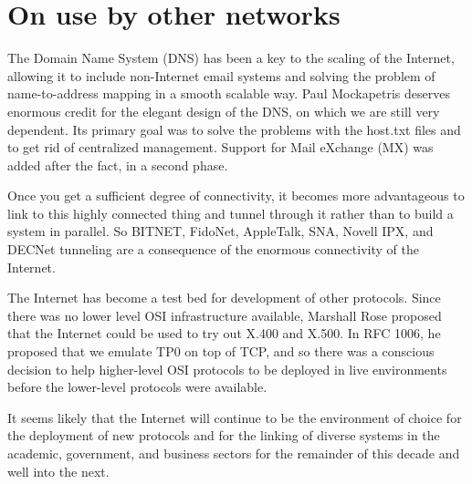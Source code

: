 \documentclass[10pt,a4paper]{scrartcl}
\begin{document}
{\section {On use by other networks}}

The Domain Name System (DNS) has been a key to the scaling of the Internet, allowing it to include non-Internet email systems and solving the problem of name-to-address mapping in a smooth scalable way. Paul Mockapetris deserves enormous credit for the elegant design of the DNS, on which we are still very dependent. Its primary goal was to solve the problems with the host.txt files and to get rid of centralized management. Support for Mail eXchange (MX) was added after the fact, in a second phase.

Once you get a sufficient degree of connectivity, it becomes more advantageous to link to this highly connected thing and tunnel through it rather than to build a system in parallel. So BITNET, FidoNet, AppleTalk, SNA, Novell IPX, and DECNet tunneling are a consequence of the enormous connectivity of the Internet.

The Internet has become a test bed for development of other protocols. Since there was no lower level OSI infrastructure available, Marshall Rose proposed that the Internet could be used to try out X.400 and X.500. In RFC 1006, he proposed that we emulate TP0 on top of TCP, and so there was a conscious decision to help higher-level OSI protocols to be deployed in live environments before the lower-level protocols were available.

It seems likely that the Internet will continue to be the environment of choice for the deployment of new protocols and for the linking of diverse systems in the academic, government, and business sectors for the remainder of this decade and well into the next.
\end{document}
